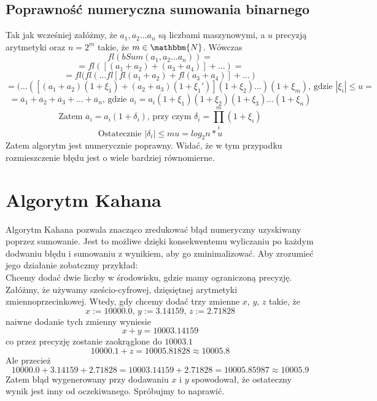 \documentclass[11pt, wide]{article}
\begin{document}
    \subsection{Poprawność numeryczna sumowania binarnego}\label{B:Poprawnosc}
    Tak jak wcześniej załóżmy, że $a_1,a_2 \ldots a_n$ są liczbami maszynowymi, a $u$ precyzją arytmetyki oraz $n = 2^m $ takie, że $ m \in \mathbbm{N}$. Wówczas
$$
    fl(bSum(a_1,a_2 \ldots a_n)) = 
$$
$$
    = fl([(a_1 + a_2)+(a_3 + a_4)] + \ldots) = 
$$
$$
    = fl(fl(\ldots fl[fl(a_1 + a_2) + fl(a_3 + a_4)] + \ldots)
$$
$$
    = (\ldots([(a_1 + a_2)(1 + \xi_1) + (a_2 + a_3)(1 + \xi_1')](1 + \xi_2) \ldots )(1 + \xi_m) \text{, gdzie } |\xi_i| \leq u = 
$$
$$
    = \ddot{a_1} + \ddot{a_2} + \ddot{a_3} + \ldots + \ddot{a_n} \text{, gdzie } \ddot{a_i} = a_i(1 + \xi_1)(1 + \xi_2)(1 + \xi_3) \ldots (1 + \xi_n)
$$  
$$
    \text{Zatem } \ddot{a_i} = a_i(1 + \delta_i) \text{, przy czym } \delta_i = \prod_i^{m}(1 + \xi_i)
$$
$$
    \text{Ostatecznie } |\delta_i| \leq mu = log_2{n}*u
$$
    Zatem algorytm jest numerycznie poprawny. 
    Widać, że w tym przypadku rozmieszczenie błędu jest o wiele bardziej równomierne.
    \section{Algorytm Kahana}\label{Kahan}
    Algorytm Kahana pozwala znacząco zredukować błąd numeryczny uzyskiwany poprzez
    sumowanie. Jest to możliwe dzięki konsekwentemu wyliczaniu po każdym dodwaniu
    błędu i sumowaniu z wynikiem, aby go zminimalizować. Aby zrozumieć jego działanie zobatczmy przykład:
    \\

    Chcemy dodać dwie liczby w środowisku, gdzie mamy ograniczoną precyzję. Załóżmy, że 
    używamy sześcio-cyfrowej, dzięsiętnej arytmetyki zmiennoprzecinkowej. Wtedy, gdy chcemy dodać trzy zmienne
    $x$, $y$, $z$  takie, że 
    $$x := 10000.0 \text{, }y:= 3.14159 \text{, } z:=2.71828$$
    naiwne dodanie tych zmienny wyniesie
     $$x + y = 10003.14159$$  co przez precyzję zostanie 
    zaokrąglone do $10003.1$
    $$10000.1 + z = 10005.81828\approx 10005.8$$
    Ale przecież
    $$10000.0 + 3.14159 + 2.71828 = 10003.14159 + 2.71828 = 10005.85987\approx 10005.9$$
    Zatem błąd wygenerowany przy dodawaniu $x$ i $y$ spowodował, że ostateczny wynik jest inny od oczekiwanego. Spróbujmy to naprawić.
    
\end{document}
